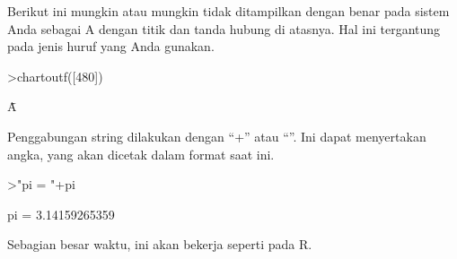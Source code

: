 \documentclass[a4paper,10pt]{article}
\begin{document}
\begin{eulernotebook}
\begin{eulercomment}
\begin{eulercomment}
\begin{eulercomment}
\begin{eulercomment}
\begin{eulercomment}
\begin{eulercomment}
\begin{eulercomment}
\begin{eulercomment}
\begin{eulercomment}
\begin{eulercomment}
\begin{eulercomment}
\begin{eulercomment}
\begin{eulercomment}
\begin{eulercomment}
\begin{eulercomment}
\begin{eulercomment}
\begin{eulercomment}
\begin{eulercomment}
\begin{eulercomment}
\begin{eulercomment}
\begin{eulercomment}
\begin{eulercomment}
\begin{eulercomment}
\begin{eulercomment}
\begin{eulercomment}
\begin{eulercomment}
\begin{eulercomment}
\begin{eulercomment}
\begin{eulercomment}
\begin{eulercomment}
\begin{eulercomment}
\begin{eulercomment}
\begin{eulercomment}
\begin{eulercomment}
\begin{eulercomment}
\begin{eulercomment}
\begin{eulercomment}
\begin{eulercomment}
\begin{eulercomment}
\begin{eulercomment}
\begin{eulercomment}
\begin{eulercomment}
\begin{eulercomment}
\begin{eulercomment}
\begin{eulercomment}
\begin{eulercomment}
\begin{eulercomment}
\begin{eulercomment}
\begin{eulercomment}
Berikut ini mungkin atau mungkin tidak ditampilkan dengan benar pada
sistem Anda sebagai A dengan titik dan tanda hubung di atasnya. Hal
ini tergantung pada jenis huruf yang Anda gunakan.
\end{eulercomment}
\begin{eulerprompt}
>chartoutf([480])
\end{eulerprompt}
\begin{euleroutput}
  Ǡ
\end{euleroutput}
\begin{eulercomment}
Penggabungan string dilakukan dengan “+” atau “\textbar{}”. Ini dapat
menyertakan angka, yang akan dicetak dalam format saat ini.
\end{eulercomment}
\begin{eulerprompt}
>"pi = "+pi
\end{eulerprompt}
\begin{euleroutput}
  pi = 3.14159265359
\end{euleroutput}
\begin{eulercomment}
Sebagian besar waktu, ini akan bekerja seperti pada R.


\end{eulercomment}
\end{eulercomment}
\end{eulercomment}
\end{eulercomment}
\end{eulercomment}
\end{eulercomment}
\end{eulercomment}
\end{eulercomment}
\end{eulercomment}
\end{eulercomment}
\end{eulercomment}
\end{eulercomment}
\end{eulercomment}
\end{eulercomment}
\end{eulercomment}
\end{eulercomment}
\end{eulercomment}
\end{eulercomment}
\end{eulercomment}
\end{eulercomment}
\end{eulercomment}
\end{eulercomment}
\end{eulercomment}
\end{eulercomment}
\end{eulercomment}
\end{eulercomment}
\end{eulercomment}
\end{eulercomment}
\end{eulercomment}
\end{eulercomment}
\end{eulercomment}
\end{eulercomment}
\end{eulercomment}
\end{eulercomment}
\end{eulercomment}
\end{eulercomment}
\end{eulercomment}
\end{eulercomment}
\end{eulercomment}
\end{eulercomment}
\end{eulercomment}
\end{eulercomment}
\end{eulercomment}
\end{eulercomment}
\end{eulercomment}
\end{eulercomment}
\end{eulercomment}
\end{eulercomment}
\end{eulercomment}
\end{eulernotebook}
\end{document}
